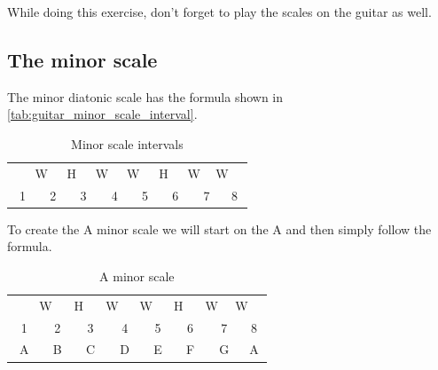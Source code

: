 While doing this exercise, don't forget to play the scales on the guitar as well.

\newpage

\subsection{The minor scale}

The minor diatonic scale has the formula shown in \autoref{tab:guitar_minor_scale_interval}.

\begin{table}[h]
	\centering
	\begin{tabular}{*{16}{c}}
		& \multicolumn{2}{P{4mm}}{\large{W}} & \multicolumn{2}{P{4mm}}{\large{H}} & \multicolumn{2}{P{4mm}}{\large{W}} & \multicolumn{2}{P{4mm}}{\large{W}} & \multicolumn{2}{P{4mm}}{\large{H}} & \multicolumn{2}{P{4mm}}{\large{W}} & \multicolumn{2}{P{4mm}}{\large{W}} & \\
		\multicolumn{2}{P{4mm}}{1} & \multicolumn{2}{P{4mm}}{2} & \multicolumn{2}{P{4mm}}{3} & \multicolumn{2}{P{4mm}}{4} & \multicolumn{2}{P{4mm}}{5} & \multicolumn{2}{P{4mm}}{6} & \multicolumn{2}{P{4mm}}{7} & \multicolumn{2}{P{4mm}}{8}
	\end{tabular}
	\caption{Minor scale intervals}
	\label{tab:guitar_minor_scale_interval}
\end{table}

To create the A minor scale we will start on the A and then simply follow the formula.

\begin{table}[h]
	\centering
	\begin{tabular}{*{16}{c}}
		& \multicolumn{2}{P{4mm}}{\large{W}} & \multicolumn{2}{P{4mm}}{\large{H}} & \multicolumn{2}{P{4mm}}{\large{W}} & \multicolumn{2}{P{4mm}}{\large{W}} & \multicolumn{2}{P{4mm}}{\large{H}} & \multicolumn{2}{P{4mm}}{\large{W}} & \multicolumn{2}{P{4mm}}{\large{W}} & \\
		\multicolumn{2}{P{4mm}}{1} & \multicolumn{2}{P{4mm}}{2} & \multicolumn{2}{P{4mm}}{3} & \multicolumn{2}{P{4mm}}{4} & \multicolumn{2}{P{4mm}}{5} & \multicolumn{2}{P{4mm}}{6} & \multicolumn{2}{P{4mm}}{7} & \multicolumn{2}{P{4mm}}{8} \\
		\multicolumn{2}{P{4mm}}{A} & \multicolumn{2}{P{4mm}}{B} & \multicolumn{2}{P{4mm}}{C} & \multicolumn{2}{P{4mm}}{D} & \multicolumn{2}{P{4mm}}{E} & \multicolumn{2}{P{4mm}}{F} & \multicolumn{2}{P{4mm}}{G} & \multicolumn{2}{P{4mm}}{A}
	\end{tabular}
	\caption{A minor scale}
	\label{tab:guitar_a_minor_scale}
\end{table}

